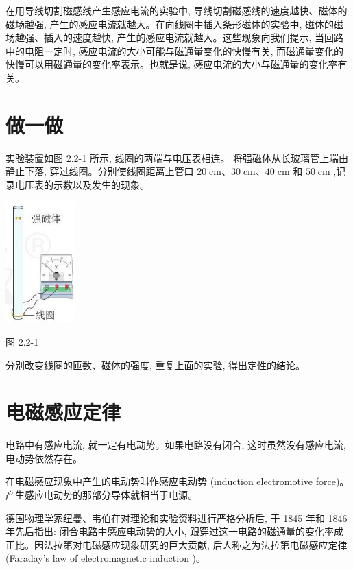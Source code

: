 \documentclass[10pt]{article}
\begin{document}
在用导线切割磁感线产生感应电流的实验中, 导线切割磁感线的速度越快、磁体的磁场越强, 产生的感应电流就越大。在向线圈中插入条形磁体的实验中, 磁体的磁场越强、插入的速度越快, 产生的感应电流就越大。这些现象向我们提示, 当回路中的电阻一定时, 感应电流的大小可能与磁通量变化的快慢有关, 而磁通量变化的快慢可以用磁通量的变化率表示。也就是说, 感应电流的大小与磁通量的变化率有关。

\section*{做一做}

实验装置如图 2.2-1 所示, 线圈的两端与电压表相连。 将强磁体从长玻璃管上端由静止下落, 穿过线圈。分别使线圈距离上管口 \({20}\mathrm{\;{cm}}\text{、}{30}\mathrm{\;{cm}}\text{、}{40}\mathrm{\;{cm}}\) 和 \({50}\mathrm{\;{cm}}\) ,记录电压表的示数以及发生的现象。

\begin{center}
\includegraphics[max width=0.2\textwidth]{images/01910e72-c5b7-7ed5-a6d4-fb3a5faefc32_35_388542.jpg}
\end{center}

图 2.2-1

分别改变线圈的匝数、磁体的强度, 重复上面的实验, 得出定性的结论。

\section*{电磁感应定律}

电路中有感应电流, 就一定有电动势。如果电路没有闭合, 这时虽然没有感应电流, 电动势依然存在。

在电磁感应现象中产生的电动势叫作感应电动势 (induction electromotive force)。产生感应电动势的那部分导体就相当于电源。

德国物理学家纽曼、韦伯在对理论和实验资料进行严格分析后, 于 1845 年和 1846 年先后指出: 闭合电路中感应电动势的大小, 跟穿过这一电路的磁通量的变化率成正比。因法拉第对电磁感应现象研究的巨大贡献, 后人称之为法拉第电磁感应定律 (Faraday's law of electromagnetic induction )。
\end{document}
